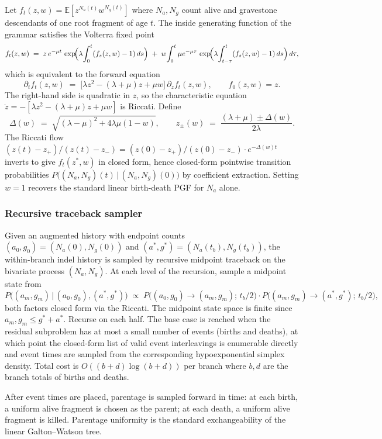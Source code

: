 Let $f_t(z, w) = \mathbb{E}[z^{N_a(t)} w^{N_g(t)}]$ where $N_a, N_g$
count alive and gravestone descendants of one root fragment of age
$t$. The inside generating function of the grammar satisfies the
Volterra fixed point
\[
f_t(z, w)
\;=\; z\, e^{-\mu t}\, \exp\!\Bigl(\lambda \!\int_0^t (f_s(z, w) - 1)\, ds\Bigr)
\;+\; w\!\int_0^t \mu e^{-\mu \tau}\, \exp\!\Bigl(\lambda \!\int_{t-\tau}^t (f_s(z, w) - 1)\, ds\Bigr)\, d\tau,
\]
which is equivalent to the forward equation
\[
\partial_t f_t(z, w) \;=\;
\bigl[\lambda z^2 - (\lambda + \mu) z + \mu w\bigr] \, \partial_z f_t(z, w),
\qquad f_0(z, w) = z.
\]
The right-hand side is quadratic in $z$, so the characteristic
equation $\dot z = -[\lambda z^2 - (\lambda + \mu) z + \mu w]$ is
Riccati. Define
\[
\Delta(w) \;=\; \sqrt{(\lambda - \mu)^2 + 4 \lambda \mu (1 - w)},
\qquad
z_\pm(w) \;=\; \frac{(\lambda + \mu) \pm \Delta(w)}{2 \lambda}.
\]
The Riccati flow
$(z(t) - z_+) / (z(t) - z_-) = (z(0) - z_+)/(z(0) - z_-) \cdot e^{-\Delta(w) t}$
inverts to give $f_t(z^*, w)$ in closed form, hence closed-form
pointwise transition probabilities
$P\!\bigl((N_a, N_g)(t)\,\big|\,(N_a, N_g)(0)\bigr)$ by coefficient
extraction. Setting $w = 1$ recovers the standard linear
birth-death PGF for $N_a$ alone.

\subsubsection*{Recursive traceback sampler}

Given an augmented history with endpoint counts
$(a_0, g_0) = (N_a(0), N_g(0))$ and
$(a^*, g^*) = (N_a(t_b), N_g(t_b))$, the within-branch indel
history is sampled by recursive midpoint traceback on the bivariate
process $(N_a, N_g)$. At each level of the recursion, sample a
midpoint state from
\[
P\!\bigl((a_m, g_m) \,\big|\, (a_0, g_0), (a^*, g^*)\bigr)
\;\propto\;
P\!\bigl((a_0, g_0) \to (a_m, g_m);\, t_b/2\bigr) \cdot
P\!\bigl((a_m, g_m) \to (a^*, g^*);\, t_b/2\bigr),
\]
both factors closed form via the Riccati. The midpoint state space
is finite since $a_m, g_m \leq g^* + a^*$. Recurse on each half.
The base case is reached when the residual subproblem has at most a
small number of events (births and deaths), at which point the
closed-form list of valid event interleavings is enumerable
directly and event times are sampled from the corresponding
hypoexponential simplex density. Total cost is
$O((b + d) \log(b + d))$ per branch where $b, d$ are the branch
totals of births and deaths.

After event times are placed, parentage is sampled forward in time:
at each birth, a uniform alive fragment is chosen as the parent; at
each death, a uniform alive fragment is killed. Parentage uniformity
is the standard exchangeability of the linear Galton--Watson tree.

